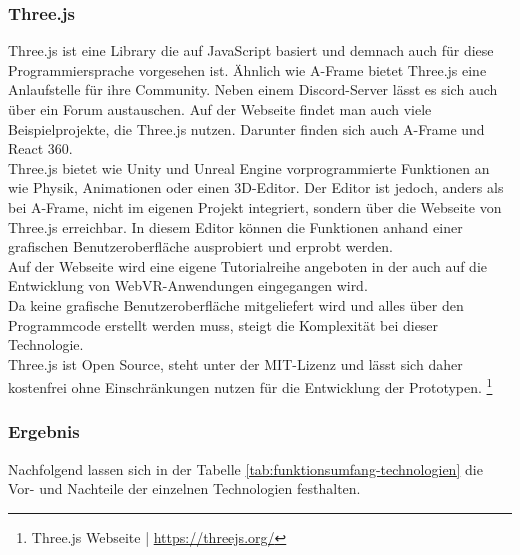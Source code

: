 \documentclass[a4paper,12pt,oneside]{article}
\begin{document}
      \subsubsection{Three.js}
        Three.js ist eine Library die auf JavaScript basiert und demnach auch
        für diese Programmiersprache vorgesehen ist. Ähnlich wie A-Frame bietet
        Three.js eine Anlaufstelle für ihre Community. Neben einem Discord-Server
        lässt es sich auch über ein Forum austauschen. Auf der Webseite findet man
        auch viele Beispielprojekte, die Three.js nutzen. Darunter finden sich auch
        A-Frame und React 360. \\
        Three.js bietet wie Unity und Unreal Engine vorprogrammierte Funktionen an
        wie Physik, Animationen oder einen 3D-Editor. Der Editor ist jedoch, anders
        als bei A-Frame, nicht im eigenen Projekt integriert, sondern über die
        Webseite von Three.js erreichbar. In diesem Editor können die
        Funktionen anhand einer grafischen Benutzeroberfläche ausprobiert und
        erprobt werden. \\
        Auf der Webseite wird eine eigene Tutorialreihe angeboten in der auch
        auf die Entwicklung von WebVR-Anwendungen eingegangen wird. \\
        Da keine grafische Benutzeroberfläche mitgeliefert wird und alles über den
        Programmcode erstellt werden muss, steigt die Komplexität bei dieser
        Technologie. \\
        Three.js ist Open Source, steht unter der MIT-Lizenz und lässt sich daher
        kostenfrei ohne Einschränkungen nutzen für die Entwicklung der Prototypen.
        \footnote{Three.js Webseite | \url{https://threejs.org/}}
      \subsubsection{Ergebnis}
        Nachfolgend lassen sich in der Tabelle \ref{tab:funktionsumfang-technologien} 
        die Vor- und Nachteile der einzelnen Technologien festhalten.
\end{document}
